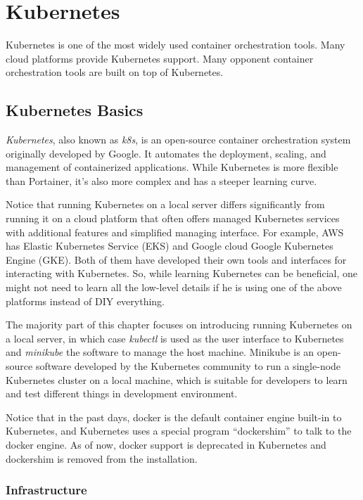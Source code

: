 \chapter{Kubernetes}

Kubernetes is one of the most widely used container orchestration tools. Many cloud platforms provide Kubernetes support. Many opponent container orchestration tools are built on top of Kubernetes.

\section{Kubernetes Basics}

\textit{Kubernetes}, also known as \textit{k8s}, is an open-source container orchestration system originally developed by Google. It automates the deployment, scaling, and management of containerized applications. While Kubernetes is more flexible than Portainer, it's also more complex and has a steeper learning curve.

Notice that running Kubernetes on a local server differs significantly from running it on a cloud platform that often offers managed Kubernetes services with additional features and simplified managing interface. For example, AWS has Elastic Kubernetes Service (EKS) and Google cloud Google Kubernetes Engine (GKE). Both of them have developed their own tools and interfaces for interacting with Kubernetes. So, while learning Kubernetes can be beneficial, one might not need to learn all the low-level details if he is using one of the above platforms instead of DIY everything.

The majority part of this chapter focuses on introducing running Kubernetes on a local server, in which case \textit{kubectl} is used as the user interface to Kubernetes and \textit{minikube} the software to manage the host machine. Minikube is an open-source software developed by the Kubernetes community to run a single-node Kubernetes cluster on a local machine, which is suitable for developers to learn and test different things in development environment.

Notice that in the past days, docker is the default container engine built-in to Kubernetes, and Kubernetes uses a special program ``dockershim'' to talk to the docker engine. As of now, docker support is deprecated in Kubernetes and dockershim is removed from the installation.

\subsection{Infrastructure}

